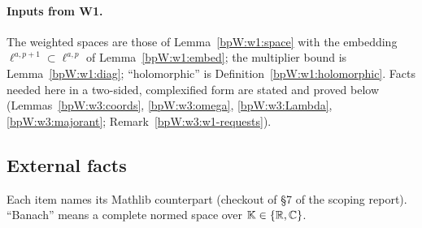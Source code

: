 \paragraph{Inputs from W1.} The weighted spaces are those of Lemma~\ref{bpW:w1:space} with the embedding
$\ell^{a,p+1}\subset\ell^{a,p}$ of Lemma~\ref{bpW:w1:embed}; the multiplier bound is Lemma~\ref{bpW:w1:diag};
``holomorphic'' is Definition~\ref{bpW:w1:holomorphic}. Facts needed here in a two-sided, complexified form are
stated and proved below (Lemmas~\ref{bpW:w3:coords}, \ref{bpW:w3:omega}, \ref{bpW:w3:Lambda},
\ref{bpW:w3:majorant}; Remark~\ref{bpW:w3:w1-requests}).

\subsection{External facts}\label{bpW:w3:ext}
\begingroup\sloppy

Each item names its Mathlib counterpart (checkout of \S7 of the scoping report). ``Banach'' means a complete
normed space over $\mathbb K\in\{\mathbb{R},\mathbb{C}\}$.

